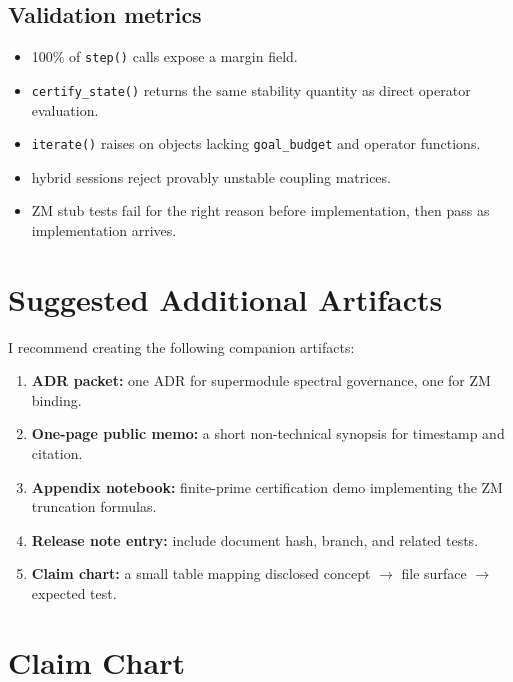\documentclass[11pt]{article}
\begin{document}
\subsection{Validation metrics}

\begin{itemize}
\item 100\% of \texttt{step()} calls expose a margin field.
\item \texttt{certify\_state()} returns the same stability quantity as direct operator evaluation.
\item \texttt{iterate()} raises on objects lacking \texttt{goal\_budget} and operator functions.
\item hybrid sessions reject provably unstable coupling matrices.
\item ZM stub tests fail for the right reason before implementation, then pass as implementation arrives.
\end{itemize}

\section{Suggested Additional Artifacts}

I recommend creating the following companion artifacts:

\begin{enumerate}[label=\arabic*.]
\item \textbf{ADR packet:} one ADR for supermodule spectral governance, one for ZM binding.
\item \textbf{One-page public memo:} a short non-technical synopsis for timestamp and citation.
\item \textbf{Appendix notebook:} finite-prime certification demo implementing the ZM truncation formulas.
\item \textbf{Release note entry:} include document hash, branch, and related tests.
\item \textbf{Claim chart:} a small table mapping disclosed concept \(\rightarrow\) file surface \(\rightarrow\) expected test.
\end{enumerate}

\section{Claim Chart}
\end{document}
